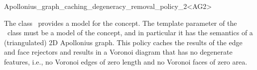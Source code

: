 

\begin{ccRefClass}{Apollonius_graph_caching_degeneracy_removal_policy_2<AG2>}


\ccDefinition

The class \ccRefName\ provides a model for the 
concept. The template parameter of the \ccRefName\ class must be a
model of the  concept, and in particular it has
the semantics of a (triangulated) 2D Apollonius graph. This policy
caches the results of the edge and face rejectors and results in a
Voronoi diagram that has no degenerate features, i.e., no Voronoi
edges of zero length and no Voronoi faces of zero area.



\ccIsModel
{}

\ccTypes
{}

\ccSeeAlso
{}\\
\\
\\
\\
\\
\end{ccRefClass}


